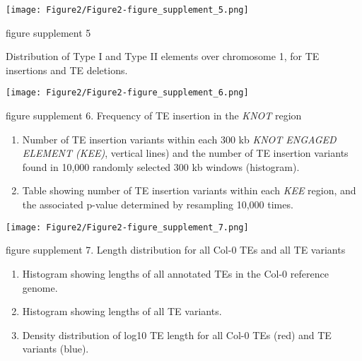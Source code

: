 \documentclass[12pt]{article}
\begin{document}
\pagebreak
\setcounter{suppfigure}{1}

\begin{suppfigure}
  \centering
  \texttt{[image: Figure2/Figure2-figure\_supplement\_5.png]}
  \caption{figure supplement 5}
  \label{fig2s5}
\end{suppfigure}

Distribution of Type I and Type II elements over chromosome 1, for TE insertions and TE deletions.

\pagebreak

\setcounter{suppfigure}{1}

\begin{suppfigure}
  \centering
  \texttt{[image: Figure2/Figure2-figure\_supplement\_6.png]}
  \caption{figure supplement 6. Frequency of TE insertion in the \emph{KNOT} region}
  \label{fig2s6}
\end{suppfigure}

\begin{enumerate}
\def\labelenumi{(\Alph{enumi})}
\item
  Number of TE insertion variants within each 300 kb \emph{KNOT ENGAGED ELEMENT (KEE)},
  vertical lines) and the number of TE insertion variants
  found in 10,000 randomly selected 300 kb windows (histogram).
\item
  Table showing number of TE insertion variants within each \emph{KEE}
  region, and the associated p-value determined by resampling 10,000
  times.
\end{enumerate}

\pagebreak

\setcounter{suppfigure}{1}

\begin{suppfigure}
  \centering
  \texttt{[image: Figure2/Figure2-figure\_supplement\_7.png]}
  \caption{figure supplement 7. Length distribution for all Col-0 TEs and all TE variants}
  \label{fig2s7}
\end{suppfigure}

\begin{enumerate}
\def\labelenumi{(\Alph{enumi})}
\item
  Histogram showing lengths of all annotated TEs in the Col-0 reference
  genome.
\item
  Histogram showing lengths of all TE variants.
\item
  Density distribution of log10 TE length for all Col-0 TEs (red) and TE
  variants (blue).
\end{enumerate}
\end{document}
